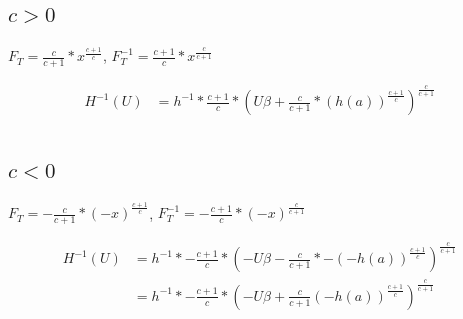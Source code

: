 \documentclass[]{article}
\begin{document}
\subsection{$c > 0$}

$F_T = \frac{c}{c + 1} * x^{\frac{c + 1}{c}}$,
$F_T^{-1} = \frac{c + 1}{c} * x^{\frac{c}{c + 1}}$


\begin{align*}
H^{-1}(U) &= h^{-1} * \frac{c + 1}{c} * \left( U\beta + \frac{c}{c + 1} * (h(a))^{\frac{c + 1}{c}} \right)^{\frac{c}{c + 1}} \\
\end{align*}

\subsection{$c < 0$}

$F_T = - \frac{c}{c + 1} * (-x)^{\frac{c + 1}{c}}$,
$F_T^{-1} = - \frac{c + 1}{c} * (-x)^{\frac{c}{c + 1}}$


\begin{align*}
H^{-1}(U) &= h^{-1} * - \frac{c + 1}{c} * \left(- U\beta - \frac{c}{c + 1} * - (-h(a))^{\frac{c + 1}{c}} \right)^{\frac{c}{c + 1}} \\
&= h^{-1} * - \frac{c + 1}{c} * \left(- U\beta + \frac{c}{c + 1} (-h(a))^{\frac{c + 1}{c}} \right)^{\frac{c}{c + 1}} \\
\end{align*}
\end{document}
